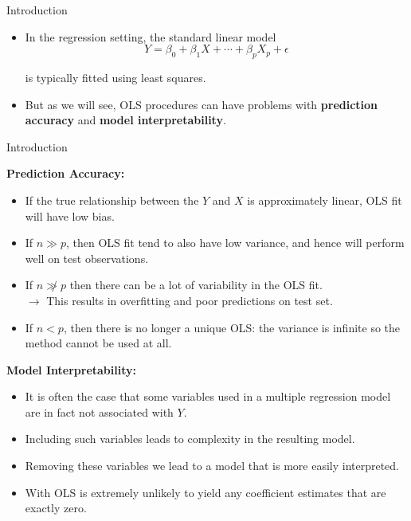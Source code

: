 \begin{frame}{Introduction}

\begin{itemize}
    \item In the regression setting, the standard linear model \pause
    $$Y = \beta_0 + \beta_1 X + \cdots + \beta_p X_p + \epsilon$$

    is typically fitted using least squares. \pause

    \item But as we will see, OLS procedures can have problems with \textbf{prediction accuracy} and \textbf{model interpretability}.
    
\end{itemize}


\end{frame}

\begin{frame}{Introduction}

\textbf{Prediction Accuracy:} \pause 

\begin{itemize}
    \item If the true relationship between the $Y$ and $X$ is approximately linear, OLS fit will have low bias. \pause 
    
    \item If $n \gg p$, then OLS fit tend to also have low variance, and hence will perform well on test observations. \pause 

    \item If $n \not \gg p$ then there can be a lot of variability in the OLS fit. \pause 
    \\ $\rightarrow$ This results in overfitting and poor predictions on test set. \pause 

    \item If $n < p$, then there is no longer a unique OLS: the variance is infinite so the method cannot be used at all. \pause 
\end{itemize}

\textbf{Model Interpretability:} \pause 

\begin{itemize}
    \item It is often the case that some variables used in a multiple regression model are in fact not associated with $Y$. \pause 

    \item Including such variables leads to complexity in the resulting model. \pause 
    
    \item Removing these variables we lead to a model that is more easily interpreted. \pause 
    
    \item With OLS is extremely unlikely to yield any coeﬃcient estimates that are exactly zero. 
\end{itemize}


\end{frame}

